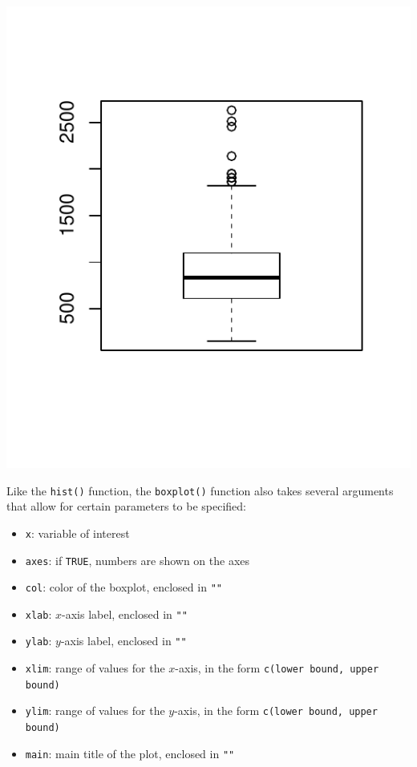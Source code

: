 \begin{centering}
\begin{knitrout}
\color{fgcolor}\begin{kframe}
\begin{alltt}
\hlopt{$}
\end{alltt}
\end{kframe}
\includegraphics[width=\maxwidth]{figure/unnamed-chunk-21-1} 

\end{knitrout}
\end{centering}

Like the \texttt{hist()} function, the \texttt{boxplot()} function also takes several arguments that allow for certain parameters to be specified:
\begin{itemize}
\item \texttt{x}: variable of interest
\item \texttt{axes}: if \texttt{TRUE}, numbers are shown on the axes
\item \texttt{col}: color of the boxplot, enclosed in \texttt{""}
\item \texttt{xlab}: $x$-axis label, enclosed in \texttt{""}
\item \texttt{ylab}: $y$-axis label, enclosed in \texttt{""}
\item \texttt{xlim}: range of values for the $x$-axis, in the form \texttt{c(lower bound, upper bound)}
\item \texttt{ylim}: range of values for the $y$-axis, in the form \texttt{c(lower bound, upper bound)}
\item \texttt{main}: main title of the plot, enclosed in \texttt{""} 

\end{itemize}


